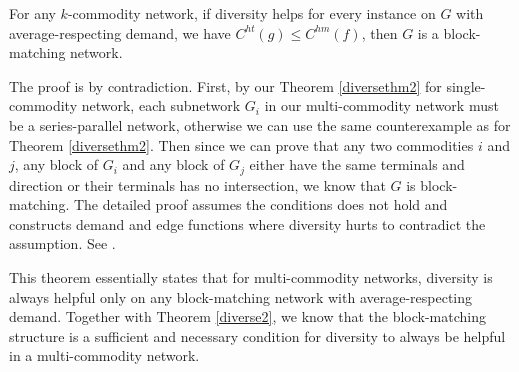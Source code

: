 \begin{theorem}
For any $k$-commodity network, if diversity helps for every instance on $G$ with average-respecting demand, we have $C^{ht}(g)\le C^{hm}(f)$, then $G$ is a block-matching network.
\end{theorem}

\begin{proof-sketch}
The proof is by contradiction. First, by our Theorem \ref{diversethm2} for single-commodity network, each subnetwork $G_i$ in our multi-commodity network must be a series-parallel network, otherwise we can use the same counterexample as for Theorem \ref{diversethm2}. Then since we can prove that any two commodities $i$ and $j$, any block of $G_i$ and any block of $G_j$ either have the same terminals and direction or their terminals has no intersection, we know that $G$ is block-matching. The detailed proof assumes the conditions does not hold and constructs demand and edge functions where diversity hurts to contradict the assumption. See \cite{??}.

\end{proof-sketch}

This theorem essentially states that for multi-commodity networks, diversity is always helpful only on any block-matching network with average-respecting demand. Together with Theorem \ref{diverse2}, we know that the block-matching structure is a sufficient and necessary condition for diversity to always be helpful in a multi-commodity network.
